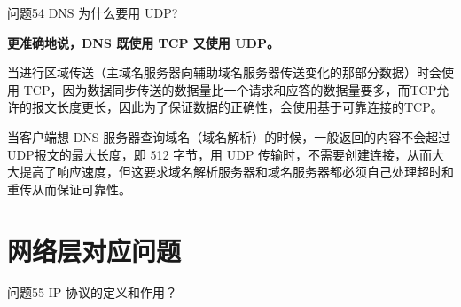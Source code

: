 \documentclass[cn,11pt,color=blue,lang=cn]{elegantbook}
\begin{document}
\begin{custom}{问题54}
DNS 为什么要用 UDP?
\end{custom}

\begin{solution}
\textbf{更准确地说，DNS 既使用 TCP 又使用 UDP。}

当进行区域传送（主域名服务器向辅助域名服务器传送变化的那部分数据）时会使用 TCP，因为数据同步传送的数据量比一个请求和应答的数据量要多，而TCP允许的报文长度更长，因此为了保证数据的正确性，会使用基于可靠连接的TCP。

当客户端想 DNS 服务器查询域名（域名解析）的时候，一般返回的内容不会超过UDP报文的最大长度，即 512 字节，用 UDP 传输时，不需要创建连接，从而大大提高了响应速度，但这要求域名解析服务器和域名服务器都必须自己处理超时和重传从而保证可靠性。
\end{solution}

\chapter{网络层对应问题}

\begin{custom}{问题55}
IP 协议的定义和作用？
\end{custom}
\end{document}
